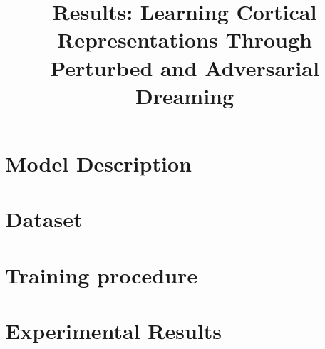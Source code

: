 \documentclass{midl} %
\title[Title of your solution]{Results: Learning Cortical Representations Through Perturbed and Adversarial Dreaming}
\begin{document}
\maketitle

\section{Model Description}


\section{Dataset}


\section{Training procedure}


\section{Experimental Results}

\end{document}
